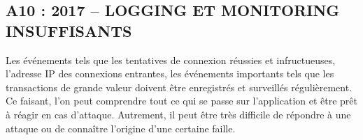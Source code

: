 \subsection*{A10 : 2017 – LOGGING ET MONITORING INSUFFISANTS}
Les événements tels que les tentatives de connexion réussies et infructueuses, l'adresse IP des connexions entrantes, les événements importants tels que les transactions de grande valeur doivent être enregistrés et surveillés régulièrement. Ce faisant, l’on peut comprendre tout ce qui se passe sur l’application et être prêt à réagir en cas d’attaque. Autrement, il peut être très difficile de répondre à une attaque ou de connaître l’origine d’une certaine faille.

